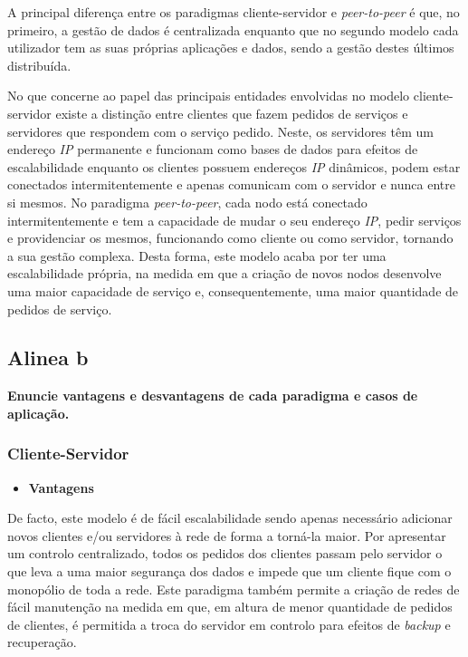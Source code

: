 \documentclass[a4paper, 11pt]{article}
\begin{document}
\vspace{0.5cm}

A principal diferença entre os paradigmas cliente-servidor e \textit{peer-to-peer} é que, no primeiro, a gestão de dados é centralizada enquanto que no segundo modelo cada utilizador tem as suas próprias aplicações e dados, sendo a gestão destes últimos distribuída.

No que concerne ao papel das principais entidades envolvidas no modelo cliente-servidor existe a distinção entre clientes que fazem pedidos de serviços e servidores que respondem com o serviço pedido. Neste, os servidores têm um endereço \textit{IP} permanente e funcionam como bases de dados para efeitos de escalabilidade enquanto os clientes possuem endereços \textit{IP} dinâmicos, podem estar conectados intermitentemente e apenas comunicam com o servidor e nunca entre si mesmos. No paradigma \textit{peer-to-peer}, cada nodo está conectado intermitentemente e tem a capacidade de mudar o seu endereço \textit{IP}, pedir serviços e providenciar os mesmos, funcionando como cliente ou como servidor, tornando a sua gestão complexa. Desta forma, este modelo acaba por ter uma escalabilidade própria, na medida em que a criação de novos nodos desenvolve uma maior capacidade de serviço e, consequentemente, uma maior quantidade de pedidos de serviço. \cite{1_a}


\subsection{Alinea b \cite{1_b1, 1_b2, 1_b3, 1_b4, 1_b5}} 
\textbf{Enuncie vantagens e desvantagens de cada paradigma e casos de aplicação.}

\subsubsection{Cliente-Servidor}

\begin{itemize}
  \item \textbf{Vantagens}
\end{itemize}

De facto, este modelo é de fácil escalabilidade sendo apenas necessário adicionar novos clientes e/ou servidores à rede de forma a torná-la maior. Por apresentar um controlo centralizado, todos os pedidos dos clientes passam pelo servidor o que leva a uma maior segurança dos dados e impede que um cliente fique com o monopólio de toda a rede. Este paradigma também permite a criação de redes de fácil manutenção na medida em que, em altura de menor quantidade de pedidos de clientes, é permitida a troca do servidor em controlo para efeitos de \textit{backup} e recuperação.
\end{document}
